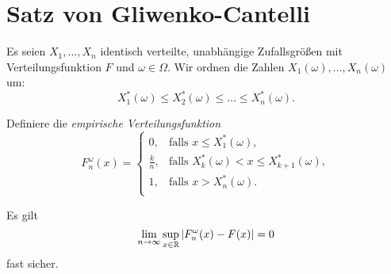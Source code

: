 \section{Satz von Gliwenko-Cantelli}
\begin{defn}
  Es seien $X_1, \ldots, X_n$ identisch verteilte, unabhängige Zufallsgrößen mit
  Verteilungsfunktion $F$ und $\omega \in \Omega$. Wir ordnen die Zahlen
  $X_1(\omega), \ldots, X_n(\omega)$ um:
  \[ X_1^*(\omega) \le X_2^*(\omega) \le \ldots \le X_n^*(\omega). \]

  Definiere die \emph{empirische Verteilungsfunktion}
  \[ F_n^\omega(x) =
    \begin{cases}
      0, & \text{falls } x \le X_1^*(\omega), \\
      \frac{k}{n}, & \text{falls } X_k^*(\omega) < x \le X_{k+1}^*(\omega), \\
      1, & \text{falls } x > X_n^*(\omega). \\
    \end{cases}
  \]
\end{defn}

\begin{thm}
  Es gilt
  \[ \lim_{n \to \infty} \sup_{x \in \mathbb{R}} | F_n^\omega(x) - F(x) | = 0 \]
  fast sicher.
\end{thm}

